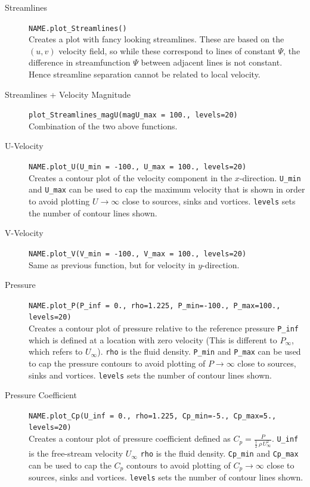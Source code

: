 \documentclass[10pt,a4paper]{article}
\begin{document}
\begin{description}
\item[Streamlines] \verb'NAME.plot_Streamlines()'\\
Creates a plot with fancy looking streamlines.
These are based on the $(u,v)$ velocity field, so while these correspond to lines of constant $\Psi$, the difference in streamfunction $\Psi$ between adjacent lines is not constant. 
Hence streamline separation cannot be related to local velocity.

\item[Streamlines + Velocity Magnitude] \verb'plot_Streamlines_magU(magU_max = 100., levels=20)' \\
Combination of the two above functions.

\item[U-Velocity] \verb'NAME.plot_U(U_min = -100., U_max = 100., levels=20)'\\
Creates a contour plot of the velocity component in the $x$-direction. 
\verb'U_min' and \verb'U_max' can be used to cap the maximum velocity that is shown in order to avoid plotting  $U\rightarrow \infty$ close to sources, sinks and vortices.
\verb'levels' sets the number of contour lines shown.

\item[V-Velocity] \verb'NAME.plot_V(V_min = -100., V_max = 100., levels=20)'\\
Same as previous function, but for velocity in $y$-direction.

\item[Pressure] \verb'NAME.plot_P(P_inf = 0., rho=1.225, P_min=-100., P_max=100., levels=20)'\\
Creates a contour plot of pressure relative to the reference pressure \verb'P_inf' which is defined at a location with zero velocity (This is different to $P_{\infty}$, which refers to $U_{\infty}$). 
\verb'rho' is the fluid density. 
\verb'P_min' and \verb'P_max' can be used to cap the pressure contours to avoid plotting of $P\rightarrow \infty$ close to sources, sinks and vortices.  
\verb'levels' sets the number of contour lines shown.

\item[Pressure Coefficient] \verb'NAME.plot_Cp(U_inf = 0., rho=1.225, Cp_min=-5., Cp_max=5., levels=20)'\\
Creates a contour plot of pressure coefficient defined as $C_p = \frac{P}{\frac{1}{2} \, \rho \, U_{\infty}^2}$. 
\verb'U_inf' is the free-stream velocity $U_\infty$ 
\verb'rho' is the fluid density. 
\verb'Cp_min' and \verb'Cp_max' can be used to cap the $C_p$ contours to avoid plotting of $C_p \rightarrow \infty$ close to sources, sinks and vortices.  
\verb'levels' sets the number of contour lines shown.

\end{description}
\end{document}
